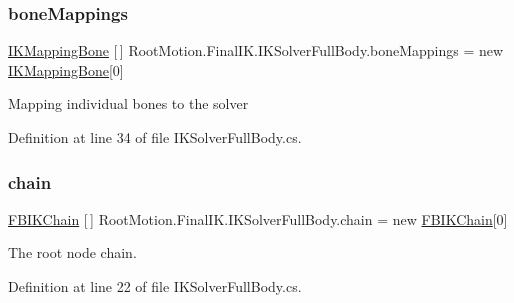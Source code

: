 \subsubsection{\texorpdfstring{bone\+Mappings}{boneMappings}}
{\footnotesize\ttfamily \mbox{\hyperlink{class_root_motion_1_1_final_i_k_1_1_i_k_mapping_bone}{I\+K\+Mapping\+Bone}} \mbox{[}$\,$\mbox{]} Root\+Motion.\+Final\+I\+K.\+I\+K\+Solver\+Full\+Body.\+bone\+Mappings = new \mbox{\hyperlink{class_root_motion_1_1_final_i_k_1_1_i_k_mapping_bone}{I\+K\+Mapping\+Bone}}\mbox{[}0\mbox{]}}



Mapping individual bones to the solver 



Definition at line 34 of file I\+K\+Solver\+Full\+Body.\+cs.

\mbox{\label{class_root_motion_1_1_final_i_k_1_1_i_k_solver_full_body_aae6ec635c069329275bd5e3eb18dac41}} 
\subsubsection{\texorpdfstring{chain}{chain}}
{\footnotesize\ttfamily \mbox{\hyperlink{class_root_motion_1_1_final_i_k_1_1_f_b_i_k_chain}{F\+B\+I\+K\+Chain}} \mbox{[}$\,$\mbox{]} Root\+Motion.\+Final\+I\+K.\+I\+K\+Solver\+Full\+Body.\+chain = new \mbox{\hyperlink{class_root_motion_1_1_final_i_k_1_1_f_b_i_k_chain}{F\+B\+I\+K\+Chain}}\mbox{[}0\mbox{]}}



The root node chain. 



Definition at line 22 of file I\+K\+Solver\+Full\+Body.\+cs.

\mbox{\label{class_root_motion_1_1_final_i_k_1_1_i_k_solver_full_body_add899bb83ac8a5c74bacaa9463bfd0cc}} 
